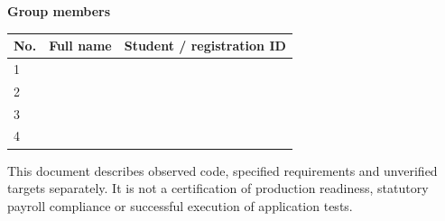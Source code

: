 {\begin{titlepage}
  \vspace{4mm}
  {\normalsize\bfseries\color{navy}Group members}\par
  \begin{tabularx}{\textwidth}{@{}L{10mm}Y L{42mm}@{}}
  \toprule No. & Full name & Student / registration ID\\\midrule
  \rule{0pt}{7mm}1 & \hrulefill & \hrulefill\\
  \rule{0pt}{7mm}2 & \hrulefill & \hrulefill\\
  \rule{0pt}{7mm}3 & \hrulefill & \hrulefill\\
  \rule{0pt}{7mm}4 & \hrulefill & \hrulefill\\
  \bottomrule
  \end{tabularx}
  \vfill
  {\small This document describes observed code, specified requirements and
  unverified targets separately. It is not a certification of production readiness,
  statutory payroll compliance or successful execution of application tests.}
  \end{titlepage}
}
